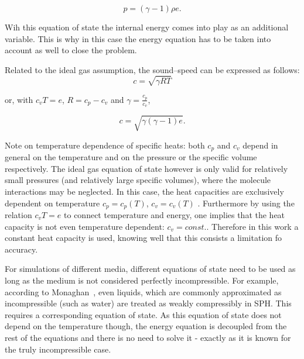 \documentclass{report}
\begin{document}


\begin{equation}
\label{eq:idealGasEqState}
 p=(\gamma-1)\rho e.
\end{equation}

Wih this equation of state the internal energy comes into play as an additional variable. This is why in this case the energy equation has to be taken into account as well to close the problem.

Related to the ideal gas assumption, the sound--speed can be expressed as follows:
\begin{equation}
\label{eq:soundSpeed}
 c=\sqrt{\gamma R T}
\end{equation}

or, with $c_v T=e$, $R=c_p-c_v$ and $\gamma=\frac{c_p}{c_v}$,

\begin{equation}
 c=\sqrt{\gamma(\gamma-1)e}.
\end{equation}

Note on temperature dependence of specific heats: both $c_p$ and $c_v$ depend in general on the temperature and on the pressure or the specific volume respectively. The ideal gas equation of state however is only valid for relatively small pressures (and relatively large specific volumes), where the molecule interactions may be neglected. In this case, the heat capacities are exclusively dependent on temperature $c_p=c_p(T)$, $c_v=c_v(T)$ \cite{EINTHERMOBUCH}. Furthermore by using the relation $c_v T=e$ to connect temperature and energy, one implies that the heat capacity is not even temperature dependent: $c_v=const.$. 
Therefore in this work a constant heat capacity is used, knowing well that this consists a limitation fo accuracy.


For simulations of different media, different equations of state need to be used as long as the medium is not considered perfectly incompressible. For example, according to Monaghan~\cite{Monaghan1994,Monaghan2005}, even liquids, which are commonly approximated as incompressible (such as water) are treated as weakly compressibly in SPH. This requires a corresponding equation of state. As this equation of state does not depend on the temperature though, the energy equation is decoupled from the rest of the equations and there is no need to solve it - exactly as it is known for the truly incompressible case.
\end{document}
